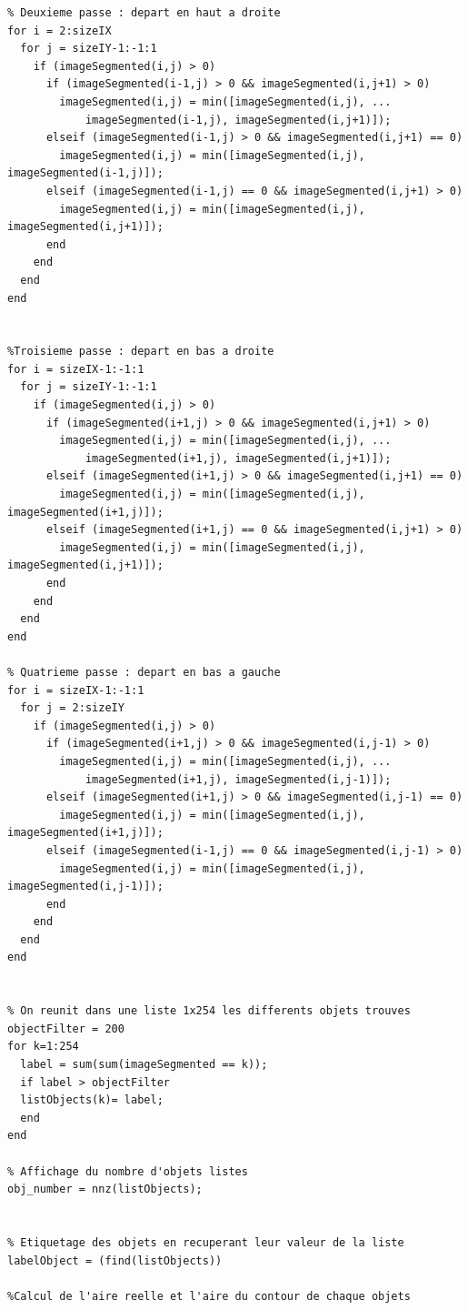 \documentclass[11pt, openright]{book}
\begin{document}
\begin{lstlisting}
% Deuxieme passe : depart en haut a droite
for i = 2:sizeIX
  for j = sizeIY-1:-1:1
    if (imageSegmented(i,j) > 0)
      if (imageSegmented(i-1,j) > 0 && imageSegmented(i,j+1) > 0)
        imageSegmented(i,j) = min([imageSegmented(i,j), ...
            imageSegmented(i-1,j), imageSegmented(i,j+1)]);
      elseif (imageSegmented(i-1,j) > 0 && imageSegmented(i,j+1) == 0)
        imageSegmented(i,j) = min([imageSegmented(i,j), imageSegmented(i-1,j)]);
      elseif (imageSegmented(i-1,j) == 0 && imageSegmented(i,j+1) > 0)
        imageSegmented(i,j) = min([imageSegmented(i,j), imageSegmented(i,j+1)]);
      end
    end
  end
end


%Troisieme passe : depart en bas a droite
for i = sizeIX-1:-1:1
  for j = sizeIY-1:-1:1
    if (imageSegmented(i,j) > 0)
      if (imageSegmented(i+1,j) > 0 && imageSegmented(i,j+1) > 0)
        imageSegmented(i,j) = min([imageSegmented(i,j), ...
            imageSegmented(i+1,j), imageSegmented(i,j+1)]);
      elseif (imageSegmented(i+1,j) > 0 && imageSegmented(i,j+1) == 0)
        imageSegmented(i,j) = min([imageSegmented(i,j), imageSegmented(i+1,j)]);
      elseif (imageSegmented(i+1,j) == 0 && imageSegmented(i,j+1) > 0)
        imageSegmented(i,j) = min([imageSegmented(i,j), imageSegmented(i,j+1)]);
      end
    end
  end
end

% Quatrieme passe : depart en bas a gauche
for i = sizeIX-1:-1:1
  for j = 2:sizeIY
    if (imageSegmented(i,j) > 0)
      if (imageSegmented(i+1,j) > 0 && imageSegmented(i,j-1) > 0)
        imageSegmented(i,j) = min([imageSegmented(i,j), ...
            imageSegmented(i+1,j), imageSegmented(i,j-1)]);
      elseif (imageSegmented(i+1,j) > 0 && imageSegmented(i,j-1) == 0)
        imageSegmented(i,j) = min([imageSegmented(i,j), imageSegmented(i+1,j)]);
      elseif (imageSegmented(i-1,j) == 0 && imageSegmented(i,j-1) > 0)
        imageSegmented(i,j) = min([imageSegmented(i,j), imageSegmented(i,j-1)]);
      end
    end
  end
end


% On reunit dans une liste 1x254 les differents objets trouves
objectFilter = 200
for k=1:254
  label = sum(sum(imageSegmented == k));
  if label > objectFilter
  listObjects(k)= label;
  end
end

% Affichage du nombre d'objets listes
obj_number = nnz(listObjects);


% Etiquetage des objets en recuperant leur valeur de la liste
labelObject = (find(listObjects))

%Calcul de l'aire reelle et l'aire du contour de chaque objets



\end{lstlisting}
\end{document}
